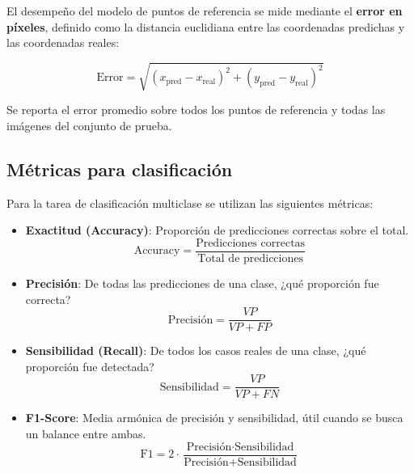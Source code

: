 El desempeño del modelo de puntos de referencia se mide mediante el \textbf{error en píxeles}, definido como la distancia euclidiana entre las coordenadas predichas y las coordenadas reales:

\begin{equation}
    \text{Error} = \sqrt{(x_{\text{pred}} - x_{\text{real}})^2 + (y_{\text{pred}} - y_{\text{real}})^2}
    \label{eq:pixel_error}
\end{equation}

Se reporta el error promedio sobre todos los puntos de referencia y todas las imágenes del conjunto de prueba.

\subsection{Métricas para clasificación}

Para la tarea de clasificación multiclase se utilizan las siguientes métricas:

\begin{itemize}
    \item \textbf{Exactitud (Accuracy)}: Proporción de predicciones correctas sobre el total.
    \begin{equation}
        \text{Accuracy} = \frac{\text{Predicciones correctas}}{\text{Total de predicciones}}
        \label{eq:accuracy}
    \end{equation}

    \item \textbf{Precisión}: De todas las predicciones de una clase, ¿qué proporción fue correcta?
    \begin{equation}
        \text{Precisión} = \frac{VP}{VP + FP}
        \label{eq:precision}
    \end{equation}

    \item \textbf{Sensibilidad (Recall)}: De todos los casos reales de una clase, ¿qué proporción fue detectada?
    \begin{equation}
        \text{Sensibilidad} = \frac{VP}{VP + FN}
        \label{eq:recall}
    \end{equation}

    \item \textbf{F1-Score}: Media armónica de precisión y sensibilidad, útil cuando se busca un balance entre ambas.
    \begin{equation}
        \text{F1} = 2 \cdot \frac{\text{Precisión} \cdot \text{Sensibilidad}}{\text{Precisión} + \text{Sensibilidad}}
        \label{eq:f1}
    \end{equation}
\end{itemize}

